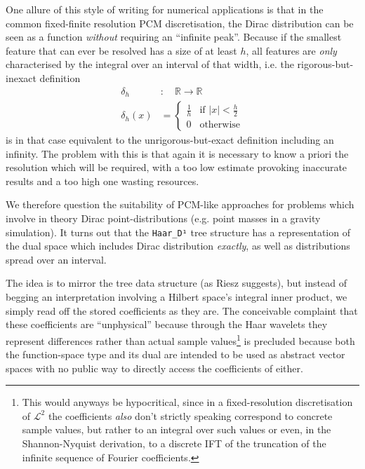 \documentclass[sigplan,review,anonymous]{acmart}\settopmatter{printfolios=true,printccs=false,printacmref=false}
\begin{document}
One allure of this style of writing for numerical applications is that in the common fixed-finite resolution PCM discretisation, the Dirac distribution can be seen as a function \emph{without} requiring an “infinite peak”. Because if the smallest feature that can ever be resolved has a size of at least $h$, all features are \emph{only} characterised by the integral over an interval of that width, i.e. the rigorous-but-inexact definition
\begin{align*}
  \delta_h &:\quad \mathbb{R} \to \mathbb{R}
 \\
  \delta_h(x) &= \begin{cases} \frac1h & \text{if }|x|<\tfrac{h}2
                          \\ 0         & \text{otherwise} \end{cases}
\end{align*}
is in that case equivalent to the unrigorous-but-exact definition including an infinity. The problem with this is that again it is necessary to know a priori the resolution which will be required, with a too low estimate provoking inaccurate results and a too high one wasting resources.

We therefore question the suitability of PCM-like approaches for problems which involve in theory Dirac point-distributions (e.g. point masses in a gravity simulation). It turns out that the \lstinline`Haar_D¹` tree structure has a representation of the dual space which includes Dirac distribution \emph{exactly}, as well as distributions spread over an interval.

The idea is to mirror the tree data structure (as Riesz suggests), but instead of begging an interpretation involving a Hilbert space's integral inner product, we simply read off the stored coefficients as they are. The conceivable complaint that these coefficients are “unphysical” because through the Haar wavelets they represent differences rather than actual sample values\footnote{%
This would anyways be hypocritical, since in a fixed-resolution discretisation of $\mathcal{L}^2$ the coefficients \emph{also} don't strictly speaking correspond to concrete sample values, but rather to an integral over such values or even, in the Shannon-Nyquist derivation, to a discrete IFT of the truncation of the infinite sequence of Fourier coefficients.
} is precluded because both the function-space type and its dual are intended to be used as abstract vector spaces with no public way to directly access the coefficients of either.
\end{document}

